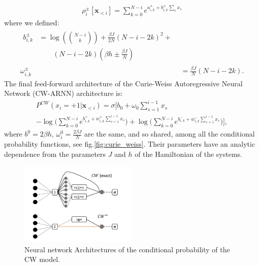 \documentclass[aps,physrev,10pt,floatfix,reprint]{revtex4-2}
\begin{document}
 \begin{eqnarray*}
 \rho_i^{\pm}[\mathbf{x}_{<i}] = \sum_{k=0}^{N-i} e^{a_{i,k}^{\pm} + b_{i,k}^{\pm} \sum_s x_s} 
\end{eqnarray*}
where we defined:
\begin{align}
\label{eq:params}
\begin{split}
b_{i,k}^{\pm} & = \log\left(\binom{N-i}{k}\right) + \frac{\beta J}{2N}\left(N-i-2k\right)^{2}+ \\
& \qquad \left(N-i-2k\right)\left(\beta h \pm \frac{\beta J}{N}\right)
\end{split} \\
\omega_{i,k}^{\pm} & = \frac{\beta J}{N}\left(N-i-2k\right).
\end{align}
The final feed-forward architecture of the Curie-Weiss Autoregressive Neural Network (CW-ARNN) architecture is:
\begin{multline*}
P^{CW}\left(x_{i}=+1|\mathbf{x}_{<i}\right)  =   \sigma \bigg[b_{0}+\omega_{0}\sum_{s=1}^{i-1}x_{s}\\
-\log\big(\sum_{k=0}^{N-i}e^{b_{i,k}^{+} + 
w_{i,k}^{+}\sum_{s=1}^{i-1}x_{s}}\big)+\log\big(\sum_{k=0}^{N-i}e^{b_{i,k}^{-} + w_{i,k}^{-}\sum_{s=1}^{i-1}x_{s}}\big)\bigg],
\end{multline*}
where $b^0=2\beta h$, $\omega^0_i = \frac{2\beta J}{N}$ are the same, and so shared, among all the conditional probability functions, see fig.\ref{fig:curie_weiss}. Their parameters have an analytic dependence from the parameters $J$ and $h$ of the Hamiltonian of the systems. 
\begin{figure}[!h]
    \centering 
    \includegraphics[width=0.5\textwidth]{img/CW_arch.pdf}
    \caption{Neural network Architectures of the conditional probability of the CW model.}
    \label{fig:CW_arch}
\end{figure}
\end{document}
